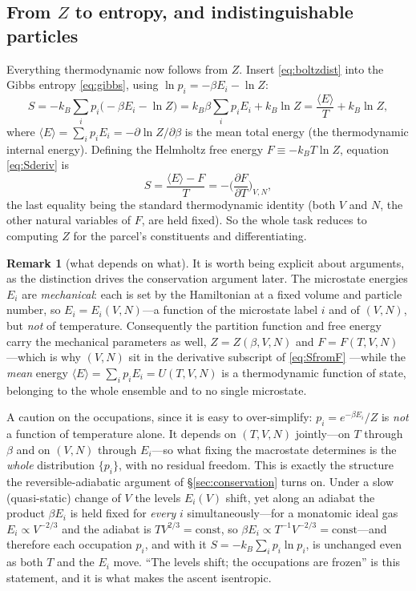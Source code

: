 \documentclass[11pt,a4paper]{article}
\theoremstyle{definition}
\newtheorem{remark}{Remark}
\begin{document}
\subsection{From \texorpdfstring{$Z$}{Z} to entropy, and indistinguishable particles}
\label{ssec:Z}

Everything thermodynamic now follows from $Z$. Insert \eqref{eq:boltzdist} into
the Gibbs entropy \eqref{eq:gibbs}, using $\ln p_i=-\beta E_i-\ln Z$:
\begin{equation}\label{eq:Sderiv}
S=-k_B\sum_i p_i\big(-\beta E_i-\ln Z\big)
 =k_B\beta\sum_i p_iE_i+k_B\ln Z
 =\frac{\langle E\rangle}{T}+k_B\ln Z ,
\end{equation}
where $\langle E\rangle=\sum_i p_iE_i=-\partial\ln Z/\partial\beta$ is the mean
total energy (the thermodynamic internal energy). Defining the Helmholtz free
energy $F\equiv-k_BT\ln Z$, equation \eqref{eq:Sderiv} is
\begin{equation}\label{eq:SfromF}
S=\frac{\langle E\rangle-F}{T}
 =-\Big(\frac{\partial F}{\partial T}\Big)_{V,N},
\end{equation}
the last equality being the standard thermodynamic identity (both $V$ and $N$,
the other natural variables of $F$, are held fixed). So the whole task reduces
to computing $Z$ for the parcel's constituents and differentiating.

\begin{remark}[what depends on what]\label{rem:args}
It is worth being explicit about arguments, as the distinction drives the
conservation argument later. The microstate energies $E_i$ are \emph{mechanical}:
each is set by the Hamiltonian at a fixed volume and particle number, so
$E_i=E_i(V,N)$---a function of the microstate label $i$ and of $(V,N)$, but
\emph{not} of temperature. Consequently the partition function and free energy
carry the mechanical parameters as well, $Z=Z(\beta,V,N)$ and $F=F(T,V,N)$
---which is why $(V,N)$ sit in the derivative subscript of \eqref{eq:SfromF}
---while the \emph{mean} energy $\langle E\rangle=\sum_i p_iE_i=U(T,V,N)$ is a
thermodynamic function of state, belonging to the whole ensemble and to no
single microstate.

A caution on the occupations, since it is easy to over-simplify: $p_i=e^{-\beta
E_i}/Z$ is \emph{not} a function of temperature alone. It depends on $(T,V,N)$
jointly---on $T$ through $\beta$ and on $(V,N)$ through $E_i$---so what fixing
the macrostate determines is the \emph{whole} distribution $\{p_i\}$, with no
residual freedom. This is exactly the structure the reversible-adiabatic
argument of \S\ref{sec:conservation} turns on. Under a slow (quasi-static)
change of $V$ the levels $E_i(V)$ shift, yet along an adiabat the product
$\beta E_i$ is held fixed for \emph{every} $i$ simultaneously---for a monatomic
ideal gas $E_i\propto V^{-2/3}$ and the adiabat is $TV^{2/3}=\mathrm{const}$,
so $\beta E_i\propto T^{-1}V^{-2/3}=\mathrm{const}$---and therefore each
occupation $p_i$, and with it $S=-k_B\sum_i p_i\ln p_i$, is unchanged even as
both $T$ and the $E_i$ move. ``The levels shift; the occupations are frozen'' is
this statement, and it is what makes the ascent isentropic.
\end{remark}
\end{document}
